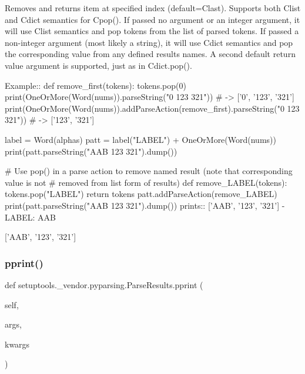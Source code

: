 \begin{DoxyVerb}Removes and returns item at specified index (default=C{last}).
Supports both C{list} and C{dict} semantics for C{pop()}. If passed no
argument or an integer argument, it will use C{list} semantics
and pop tokens from the list of parsed tokens. If passed a 
non-integer argument (most likely a string), it will use C{dict}
semantics and pop the corresponding value from any defined 
results names. A second default return value argument is 
supported, just as in C{dict.pop()}.

Example::
    def remove_first(tokens):
tokens.pop(0)
    print(OneOrMore(Word(nums)).parseString("0 123 321")) # -> ['0', '123', '321']
    print(OneOrMore(Word(nums)).addParseAction(remove_first).parseString("0 123 321")) # -> ['123', '321']

    label = Word(alphas)
    patt = label("LABEL") + OneOrMore(Word(nums))
    print(patt.parseString("AAB 123 321").dump())

    # Use pop() in a parse action to remove named result (note that corresponding value is not
    # removed from list form of results)
    def remove_LABEL(tokens):
tokens.pop("LABEL")
return tokens
    patt.addParseAction(remove_LABEL)
    print(patt.parseString("AAB 123 321").dump())
prints::
    ['AAB', '123', '321']
    - LABEL: AAB

    ['AAB', '123', '321']
\end{DoxyVerb}
 \mbox{\label{classsetuptools_1_1__vendor_1_1pyparsing_1_1_parse_results_a9222a3ef2d28e03e33d1133e56d34f80}} 
\subsubsection{\texorpdfstring{pprint()}{pprint()}}
{\footnotesize\ttfamily def setuptools.\+\_\+vendor.\+pyparsing.\+Parse\+Results.\+pprint (\begin{DoxyParamCaption}\item[{}]{self,  }\item[{}]{args,  }\item[{}]{kwargs }\end{DoxyParamCaption})}

